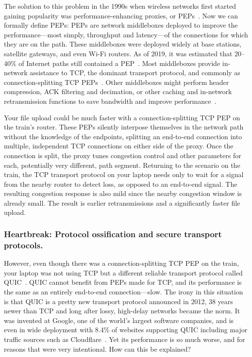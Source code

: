 The solution to this problem in the 1990s when wireless networks first started
gaining popularity was performance-enhancing proxies, or PEPs~\cite{rfc3135}.
Now we can formally
define PEPs: PEPs are network middleboxes deployed to improve the
performance---most simply, throughput and latency---of the connections for
which they are on the path. These middleboxes were deployed widely at base
stations, satellite gateways, and even Wi-Fi routers. As of 2019, it was
estimated that 20--40\% of Internet paths still contained a
PEP~\cite{honda2011still, edeline2019bottomup}. Most
middleboxes provide in-network assistance to TCP, the dominant transport
protocol, and commonly as connection-splitting TCP PEPs~\cite
{kapoor2005achieving,caini2006pepsal,davern2011httpep,farkas2012splittcp,hayes2019mmwave}.
Other middleboxes
might perform header compression, ACK filtering and decimation, or other
caching and in-network retransmission functions to save bandwidth and improve
performance~\cite
{balakrishnan1995snoop,polese2017milliproxy,cronkite2016vcc,he2016acdc,mihaly2012mobilePEP}.

Your file upload could be much faster with a connection-splitting TCP PEP on the
train's router. These PEPs silently interpose themselves in the network path
without the knowledge of the endpoints, splitting
an end-to-end connection into multiple, independent TCP connections on either
side of the proxy. Once the connection is split, the proxy tunes congestion
control and other parameters for each, potentially very different, path
segment. Returning to the scenario on the train, the TCP transport protocol on
your laptop needs only to wait for a signal from the nearby router to detect
loss, as opposed to an end-to-end signal. The resulting congestion response is
also mild since the nearby congestion window is already small. The result is
earlier retransmissions and a significantly faster file upload.

\subsubsection{Heartbreak: Protocol ossification and secure transport protocols.}

However, even though there was a connection-splitting TCP PEP on the train, your
laptop was not using TCP but a different reliable transport protocol called
QUIC~\cite{rfc9000}. QUIC cannot benefit from PEPs made for TCP, and its
performance is the
same as an entirely end-to-end connection---slow. The irony in this situation
is that QUIC is a pretty new transport protocol announced in 2012, 38 years
newer than TCP and long after lossy, high-delay networks became the norm. It
was invented at Google, one of the world's largest software companies, and is
even in wide deployment with 8.4\% of websites supporting QUIC including major
traffic sources such as Cloudflare~\cite{zirngibl2021quicdeployment,w3techs,quiche}.
Yet its performance is so much worse, and
for reasons that were very intentional. How can this be explained?

